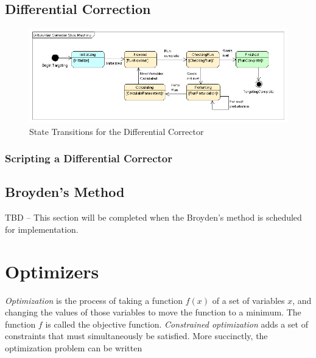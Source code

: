 \subsection{Differential Correction}

\begin{figure}[htb]
\begin{center}
\includegraphics[400,158]{Images/DifferentialCorrectorStateMachine.png}
\caption{\label{figure:DifferentialCorrectorStateMachine}State Transitions for
the Differential Corrector}
\end{center}
\end{figure}

\subsubsection{Scripting a Differential Corrector}

\begin{quote}
\end{quote}


\subsection{Broyden's Method}

TBD -- This section will be completed when the Broyden's method is scheduled for implementation.

\section{Optimizers}

\textit{Optimization} is the process of taking a function $f(x)$ of a set of variables $x$, and
changing the values of those variables to move the function to a minimum.  The function $f$ is
called the objective function.  \textit{Constrained optimization} adds a set of constraints that
must simultaneously be satisfied.  More succinctly, the optimization problem can be written

